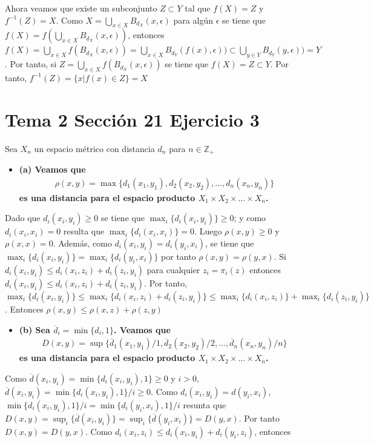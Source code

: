 \documentclass{article}
\begin{document}
Ahora veamos que existe un subconjunto $Z\subset Y$ tal que $f(X)=Z$ y $f^{-1}(Z)=X$. Como $X=\bigcup_{x\in X}B_{d_X}(x,\epsilon)$ para algún $\epsilon$ se tiene que $f(X)=f(\bigcup_{x\in X}B_{d_X}(x,\epsilon))$, entonces $f(X)=\bigcup_{x\in X}f(B_{d_X}(x,\epsilon))=\bigcup_{x\in X}B_{d_Y}(f(x),\epsilon))\subset \bigcup_{y\in Y}B_{d_Y}(y,\epsilon))=Y$. Por tanto, si $Z=\bigcup_{x\in X}f(B_{d_X}(x,\epsilon))$ se tiene que $f(X)=Z\subset Y$. Por tanto, $f^{-1}(Z)=\{x|f(x)\in Z\}=X$
\section{Tema 2 Sección 21 Ejercicio 3}
Sea $X_n$ un espacio métrico con distancia $d_n$ para $n\in \mathbb{Z}_+$
\begin{itemize}
\item \bf (a) \rm Veamos que 
\begin{eqnarray}
\rho(x,y)=\max\{ d_1(x_1,y_1),d_2(x_2,y_2),..., d_n(x_n,y_n)\}\nonumber
\end{eqnarray}
es una distancia para el espacio producto $X_1\times X_2\times ...\times X_n$.
\end{itemize}
Dado que $d_i(x_i,y_i)\geq 0$ se tiene que $\max_i\{d_i(x_i,y_i)\}\geq 0$; y como $d_i(x_i,x_i)=0$ resulta que $\max_i\{d_i(x_i,x_i)\}= 0$. Luego $\rho(x,y)\geq 0$ y $\rho(x,x)=0$. Además, como $d_i(x_i,y_i)=d_i(y_i,x_i)$, se tiene que $\max_i\{d_i(x_i,y_i)\}=\max_i\{d_i(y_i,x_i)\}$ por tanto $\rho(x,y)=\rho(y,x)$. Si $d_i(x_i,y_i)\leq d_i(x_i,z_i)+d_i(z_i,y_i)$ para cualquier $z_i=\pi_i(z)$ entonces $d_i(x_i,y_i)\leq d_i(x_i,z_i)+d_i(z_i,y_i)$. Por tanto, $\max_i\{d_i(x_i,y_i)\}\leq \max_i\{d_i(x_i,z_i)+d_i(z_i,y_i)\}\leq \max_i\{d_i(x_i,z_i)\}+\max_i\{d_i(z_i,y_i)\}$. Entonces $\rho(x,y)\leq \rho(x,z)+\rho(z,y)$
\begin{itemize}
\item \bf (b) \rm Sea $\overline{d}_i=\min\{d_i,1\}$. Veamos que
\begin{eqnarray}
D(x,y)=\sup\{ \overline{d}_1(x_1,y_1)/1,\overline{d}_2(x_2,y_2)/2,..., \overline{d}_n(x_n,y_n)/n\}\nonumber
\end{eqnarray}
es una distancia para el espacio producto $X_1\times X_2\times ...\times X_n$.
\end{itemize}
Como $\overline{d}(x_i,y_i)=\min\{d_i(x_i,y_i),1\}\geq 0$ y $i>0$, $\overline{d}(x_i,y_i)=\min\{d_i(x_i,y_i),1\}/i\geq 0$. Como $d_i(x_i,y_i)=d(y_i,x_i)$, $\min\{d_i(x_i,y_i),1\}/i=\min\{d_i(y_i,x_i),1\}/i$ resunta que $D(x,y)=\sup_i\{\overline{d}(x_i,y_i)\}=\sup_i\{\overline{d}(y_i,x_i)\}=D(y,x)$. Por tanto $D(x,y)=D(y,x)$. Como $d_i(x_i,z_i)\leq d_i(x_i,y_i)+d_i(y_i,z_i)$, entonces
\end{document}

